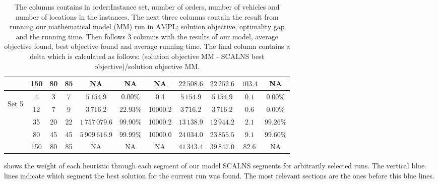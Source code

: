 \documentclass[../main.tex]{subfiles}
\begin{document}
\begin{table}
\begin{adjustbox}{width=0.95\columnwidth,center}
\begin{tabular}{|cccc|ccc|ccc|c|}
                        & 150     & 80    & 85    & NA              & NA            & NA        & $22\,508.6$   & $22\,252.6$   & $103.4$   & NA  \\
            \hline
                \multirow{5}{*}{\begin{sideways} Set 5 \end{sideways}}  
                        & 4       & 3     & 7     & $5\,154.9$      & $0.00\%$      & 0.4       & $5\,154.9$    & $5\,154.9$    & $0.1$     & $0.00\%$  \\
                        & 12      & 7     & 9     & $3\,716.2$      & $22.93\%$     & 10000.2   & $3\,716.2$    & $3\,716.2$    & $0.6$     & $0.00\%$  \\
                        & 35      & 20    & 22    & $1\,757\,079.6$ & $99.90\%$     & 10000.2   & $13\,138.9$   & $12\,944.2$   & $2.1$     & $99.26\%$  \\
                        & 80      & 45    & 45    & $5\,909\,616.9$ & $99.99\%$    & 10000.0   & $24\,034.0$   & $23\,855.5$   & $9.1$     & $99.60\%$  \\
                        & 150     & 80    & 85    & NA              & NA            & NA        & $41\,343.4$   & $39\,847.0$   & $82.6$    & NA  \\
            \hline
            \end{tabular}
    \end{adjustbox}
    \label{tab:finRes}
    \caption*{The columns contains in order:Instance set, number of orders, number of vehicles and number of locations in the instances. 
    The next three columns contain the result from running our mathematical model (MM) run in AMPL; solution objective, optimality gap and the running time.
    Then follows 3 columns with the results of our model, average objective found, best objective found and average running time. 
    The final column contains a delta which is calculated as follows: (solution objective MM - SCALNS best objective)/solution objective MM.}
\end{table}

 shows the weight of each heuristic through each segment of our model SCALNS segments for arbitrarily selected runs. 
The vertical blue lines indicate which segment the best solution for the current run was found. The most relevant sections are the ones before this blue lines.
\end{document}
